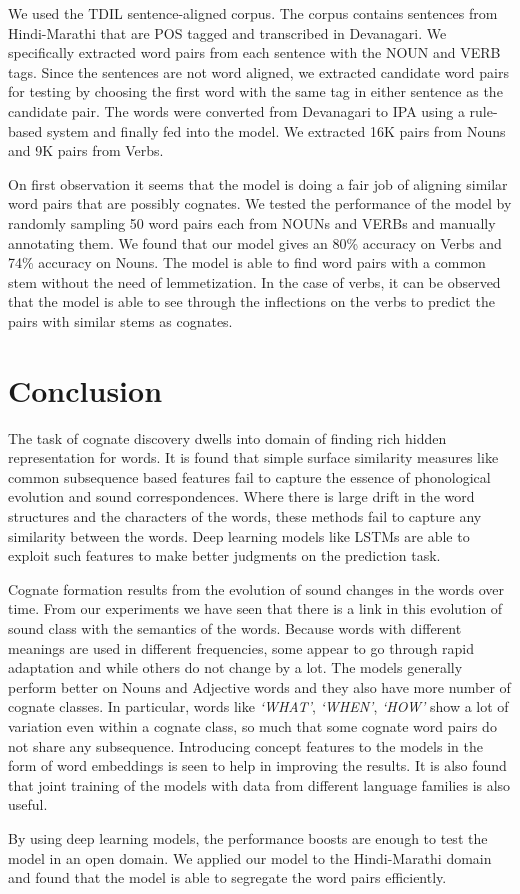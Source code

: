 \documentclass[11pt,letterpaper]{article}
\begin{document}
We used the TDIL sentence-aligned corpus. The corpus contains sentences from Hindi-Marathi that are POS tagged and transcribed in Devanagari. We specifically extracted word pairs from each sentence with the NOUN and VERB tags. Since the sentences are not word aligned, we extracted candidate word pairs for testing by choosing the first word with the same tag in either sentence as the candidate pair. The words were converted from Devanagari to IPA using a rule-based system and finally fed into the model. We extracted 16K pairs from Nouns and 9K pairs from Verbs.

On first observation it seems that the model is doing a fair job of aligning similar word pairs that are possibly cognates. We tested the performance of the model by randomly sampling 50 word pairs each from NOUNs and VERBs and manually annotating them. We found that our model gives an 80\% accuracy on Verbs and 74\% accuracy on Nouns. The model is able to find word pairs with a common stem without the need of lemmetization. In the case of verbs, it can be observed that the model is able to see through the inflections on the verbs to predict the pairs with similar stems as cognates. 

\section{Conclusion}

The task of cognate discovery dwells into domain of finding rich hidden representation for words. It is found that simple surface similarity measures like common subsequence based features fail to capture the essence of phonological evolution and sound correspondences. Where there is large drift in the word structures and the characters of the words, these methods fail to capture any similarity between the words. Deep learning models like LSTMs are able to exploit such features to make better judgments on the prediction task. 

Cognate formation results from the evolution of sound changes in the words over time. From our experiments we have seen that there is a link in this evolution of sound class with the semantics of the words. Because words with different meanings are used in different frequencies, some appear to go through rapid adaptation and while others do not change by a lot. The models generally perform better on Nouns and Adjective words and they also have more number of cognate classes. In particular, words like \textit{`WHAT'}, \textit{`WHEN'}, \textit{`HOW'} show a lot of variation even within a cognate class, so much that some cognate word pairs do not share any subsequence. Introducing concept features to the models in the form of word embeddings is seen to help in improving the results. It is also found that joint training of the models with data from different language families is also useful.

By using deep learning models, the performance boosts are enough to test the model in an open domain. We applied our model to the Hindi-Marathi domain and found that the model is able to segregate the word pairs efficiently. 



\end{document}

